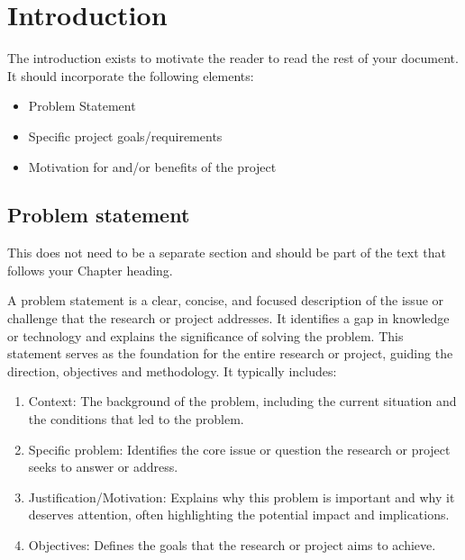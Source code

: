 \documentclass[ms,twoside,print]{nuthesis}
\theoremstyle{definition}
\begin{document}

\tableofcontents
\listoffigures
\listoftables

\mainmatter

\chapter{Introduction}\label{chap:introduction}

The introduction exists to motivate the reader to read the rest of your document. It should incorporate the following elements:

\begin{itemize}
  \item Problem Statement
  \item Specific project goals/requirements
  \item Motivation for and/or benefits of the project
\end{itemize}

\section{Problem statement}

This does not need to be a separate section and should be part of the text that follows your Chapter heading. 

A problem statement is a clear, concise, and focused description of the issue or challenge that the research or project addresses. It identifies a gap in knowledge or technology and explains the significance of solving the problem. This statement serves as the foundation for the entire research or project, guiding the direction, objectives and methodology. It typically includes:

\begin{enumerate}
  \item Context: The background of the problem, including the current situation and the conditions that led to the problem.
  \item Specific problem: Identifies the core issue or question the research or project seeks to answer or address.
  \item Justification/Motivation: Explains why this problem is important and why it deserves attention, often highlighting the potential impact and implications.
  \item Objectives: Defines the goals that the research or project aims to achieve. 
\end{enumerate}
\end{document}
